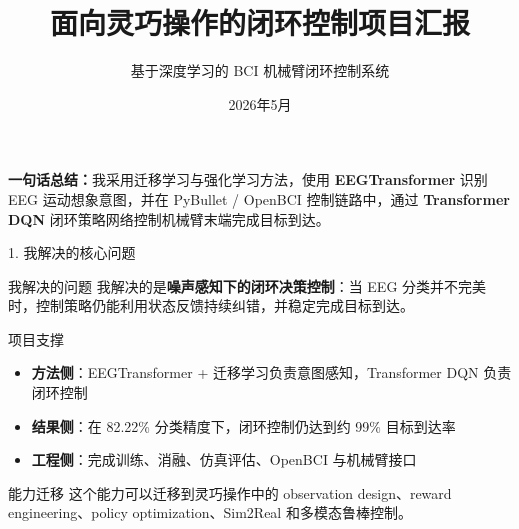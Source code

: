 \documentclass[UTF8,aspectratio=169,11pt]{ctexbeamer}
\title{面向灵巧操作的闭环控制项目汇报}
\subtitle{基于深度学习的 BCI 机械臂闭环控制系统}
\author{}
\institute{RL / Embodied AI / Robust Control}
\date{2026年5月}
\begin{document}
\begin{frame}
    \titlepage
    \vspace{-4mm}
    \begin{center}
        \small
        \parbox{0.92\textwidth}{\centering
        \textbf{一句话总结：}我采用迁移学习与强化学习方法，使用 \textbf{EEGTransformer} 识别 EEG 运动想象意图，并在 PyBullet / OpenBCI 控制链路中，通过 \textbf{Transformer DQN} 闭环策略网络控制机械臂末端完成目标到达。}
    \end{center}
\end{frame}

\begin{frame}[shrink=8]{1. 我解决的核心问题}

    \begin{block}{我解决的问题}
        我解决的是\textbf{噪声感知下的闭环决策控制}：当 EEG 分类并不完美时，控制策略仍能利用状态反馈持续纠错，并稳定完成目标到达。
    \end{block}

    \vspace{2mm}
    \begin{exampleblock}{项目支撑}
        \begin{itemize}
            \item \textbf{方法侧}：EEGTransformer + 迁移学习负责意图感知，Transformer DQN 负责闭环控制
            \item \textbf{结果侧}：在 82.22\% 分类精度下，闭环控制仍达到约 99\% 目标到达率
            \item \textbf{工程侧}：完成训练、消融、仿真评估、OpenBCI 与机械臂接口
        \end{itemize}
    \end{exampleblock}

    \vspace{2mm}
    \begin{alertblock}{能力迁移}
        这个能力可以迁移到灵巧操作中的 observation design、reward engineering、policy optimization、Sim2Real 和多模态鲁棒控制。
    \end{alertblock}
\end{frame}
\end{document}
